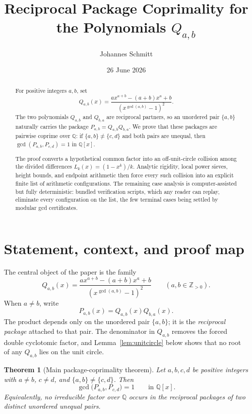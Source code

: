 \documentclass[11pt]{article}
\title{Reciprocal Package Coprimality for the Polynomials \(Q_{a,b}\)}
\author{Johannes Schmitt}
\date{26 June 2026}
\numberwithin{equation}{section}
\newtheorem{theorem}{Theorem}[section]
\theoremstyle{definition}
\newcommand{\Q}{\mathbb Q}
\newcommand{\Z}{\mathbb Z}
\begin{document}
\maketitle


\begin{abstract}
For positive integers \(a,b\), set
\[
 Q_{a,b}(x)=
 \frac{a x^{a+b}-(a+b)x^a+b}{(x^{\gcd(a,b)}-1)^2}.
\]
The two polynomials \(Q_{a,b}\) and \(Q_{b,a}\) are reciprocal partners, so an
unordered pair \(\{a,b\}\) naturally carries the package
\(P_{a,b}=Q_{a,b}Q_{b,a}\).  We prove that these packages are pairwise coprime
over \(\Q\): if \(\{a,b\}\neq\{c,d\}\) and both pairs are unequal, then
\(\gcd(P_{a,b},P_{c,d})=1\) in \(\Q[x]\).

The proof converts a hypothetical common factor into an off-unit-circle
collision among the divided differences \(L_k(x)=(1-x^k)/k\).  Analytic
rigidity, local power sieves, height bounds, and endpoint arithmetic then
force every such collision into an explicit finite list of arithmetic
configurations.  The remaining case analysis is computer-assisted but fully
deterministic: bundled verification scripts, which any reader can replay,
eliminate every configuration on the list, the few terminal cases being
settled by modular gcd certificates.
\end{abstract}

\tableofcontents


\section{Statement, context, and proof map}

The central object of the paper is the family
\[
 Q_{a,b}(x)=
 \frac{a x^{a+b}-(a+b)x^a+b}{(x^{\gcd(a,b)}-1)^2}
 \qquad(a,b\in\Z_{>0}).
\]
When \(a\neq b\), write
\[
 P_{a,b}(x)=Q_{a,b}(x)Q_{b,a}(x).
\]
The product depends only on the unordered pair \(\{a,b\}\); it is the
\emph{reciprocal package} attached to that pair.  The denominator in
\(Q_{a,b}\) removes the forced double cyclotomic factor, and
Lemma~\ref{lem:unitcircle} below shows that no root of any \(Q_{a,b}\)
lies on the unit circle.

\begin{theorem}[Main package-coprimality theorem]\label{thm:main}
Let \(a,b,c,d\) be positive integers with \(a\neq b\), \(c\neq d\), and
\(\{a,b\}\neq\{c,d\}\).  Then
\[
 \gcd\bigl(P_{a,b},P_{c,d}\bigr)=1
 \qquad\text{in }\Q[x].
\]
Equivalently, no irreducible factor over \(\Q\) occurs in the reciprocal
packages of two distinct unordered unequal pairs.
\end{theorem}
\end{document}

